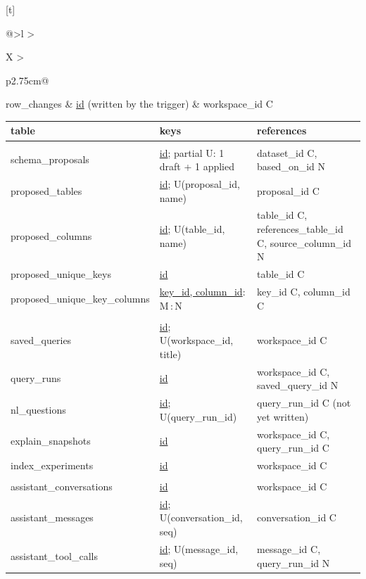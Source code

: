 \documentclass[10pt,a4paper]{article}
\begin{document}
\begin{topic}[cOpt]
{\begin{minipage}[t]{0.488\linewidth}
\begin{tabularx}{\linewidth}[t]{@{}>{\ttfamily}l >{\raggedright\arraybackslash}X >{\raggedright\arraybackslash}p{2.75cm}@{}}
row\_changes & \underline{id} (written by the trigger) & workspace\_id C\\
\bottomrule
\end{tabularx}
\end{minipage}\hfill
\begin{minipage}[t]{0.488\linewidth}
\begin{tabularx}{\linewidth}[t]{@{}>{\ttfamily}l >{\raggedright\arraybackslash}X >{\raggedright\arraybackslash}p{2.75cm}@{}}
\toprule
\normalfont\bfseries table & \bfseries keys & \bfseries references\\
\midrule
\multicolumn{3}{@{}l}{\color{cOpt}\bfseries Designs}\\
schema\_proposals & \underline{id}; partial U: 1 draft + 1 applied & dataset\_id C, based\_on\_id N\\
proposed\_tables & \underline{id}; U(proposal\_id, name) & proposal\_id C\\
proposed\_columns & \underline{id}; U(table\_id, name) & table\_id C, references\_table\_id C, source\_column\_id N\\
proposed\_unique\_keys & \underline{id} & table\_id C\\
proposed\_unique\_key\_columns & \underline{key\_id, column\_id}: M\,:\,N & key\_id C, column\_id C\\
\multicolumn{3}{@{}l}{\color{cOpt}\bfseries Queries and performance}\\
saved\_queries & \underline{id}; U(workspace\_id, title) & workspace\_id C\\
query\_runs & \underline{id} & workspace\_id C, saved\_query\_id N\\
nl\_questions & \underline{id}; U(query\_run\_id) & query\_run\_id C (not yet written)\\
explain\_snapshots & \underline{id} & workspace\_id C, query\_run\_id C\\
index\_experiments & \underline{id} & workspace\_id C\\
\multicolumn{3}{@{}l}{\color{cOpt}\bfseries Assistant (optional)}\\
assistant\_conversations & \underline{id} & workspace\_id C\\
assistant\_messages & \underline{id}; U(conversation\_id, seq) & conversation\_id C\\
assistant\_tool\_calls & \underline{id}; U(message\_id, seq) & message\_id C, query\_run\_id N\\
\bottomrule
\end{tabularx}
\end{minipage}\par}

\end{topic}
\end{document}
